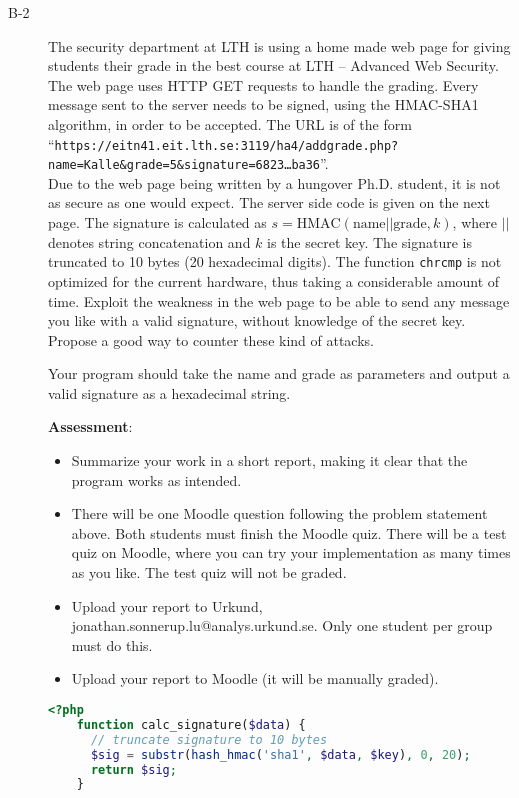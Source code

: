 \documentclass{article}
\begin{document}
\begin{description}
			
			\item[B-2]{The security department at LTH is using a home made web page for giving students their grade in the best course
				at LTH -- Advanced Web Security. The web page uses HTTP GET requests to handle the grading. Every message sent to the server
				needs to be signed, using the HMAC-SHA1 algorithm, in order to be accepted. The URL is of the form\\
				``\texttt{https://eitn41.eit.lth.se:3119/ha4/addgrade.php?name=Kalle\&grade=5\&signature=6823\ldots ba36}''.\\
				Due to the web page being written by a hungover Ph.D. student, it is not as secure as one would expect.
				The server side code is given on the next page.
				The signature is calculated as $s = \textrm{HMAC}(\textrm{name}||\textrm{grade}, k)$, where $||$ denotes 
				string concatenation and $k$ is the secret key. The signature is truncated to 10 bytes (20 hexadecimal digits).
				The function \texttt{chrcmp} is not optimized for the current hardware, 
				thus taking a considerable amount of time.
				Exploit the weakness in the web page to be able to send any message you like with a valid signature, 
				without knowledge of the secret key. Propose a good way to counter these kind of attacks.
				
				Your program should take the name and grade as parameters and output a valid signature as a hexadecimal string.
				
				\textbf{Assessment}:
				\begin{itemize}
					\item Summarize your work in a short report, making it clear that the program works as intended.
					
					\item There will be one Moodle question following the problem statement above. Both students must finish the Moodle quiz.
					There will be a test quiz on Moodle, where you can try your implementation as many times as you like. The test quiz will not be graded.
					
					\item Upload your report to Urkund, jonathan.sonnerup.lu@analys.urkund.se. Only one student per group must do this.
					
					\item Upload your report to Moodle (it will be manually graded).
				\end{itemize}
				
	\begin{lstlisting}[float=h, style=customc, language=php] 
	<?php
	function calc_signature($data) {
	  // truncate signature to 10 bytes
	  $sig = substr(hash_hmac('sha1', $data, $key), 0, 20);
	  return $sig;
	}
	

\end{lstlisting}}
\end{description}
\end{document}
